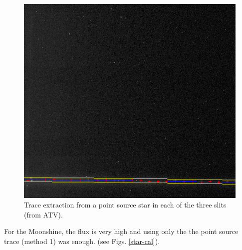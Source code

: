 \begin{figure}[htb]
\begin{center}
\includegraphics[scale=0.25]{plots/trace/point1.png}
\caption{Trace extraction from a point source  star in each of the three
slits
(from ATV).}
\label{f}
\end{center}
\end{figure}

 For the Moonshine, the flux is very high and using only the the point
source trace (method 1) was enough.
(see Figs. \ref{star-cal}).



